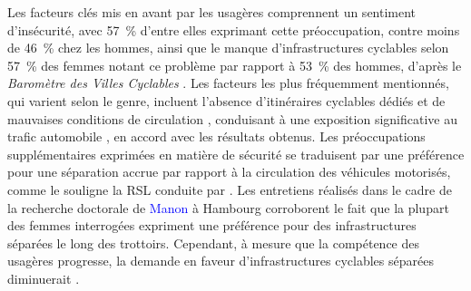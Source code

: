 \begin{refsegment}
Les facteurs clés mis en avant par les usagères comprennent un sentiment d'insécurité, avec 57~\% d'entre elles exprimant cette préoccupation, contre moins de 46~\% chez les hommes, ainsi que le manque d'infrastructures cyclables selon 57~\% des femmes notant ce problème par rapport à 53~\% des hommes, d'après le \textsl{Baromètre des Villes Cyclables} \textcolor{blue}{\autocite[26]{vermeulen_barometre_2022}}. Les facteurs les plus fréquemment mentionnés, qui varient selon le genre, incluent l'absence d'itinéraires cyclables dédiés et de mauvaises conditions de circulation \textcolor{blue}{\autocite[61]{dyck_perceived_2013}}, conduisant à une exposition significative au trafic automobile \textcolor{blue}{\autocites[36]{krizek_gender_2005}[9]{mitra_can_2019}}, en accord avec les résultats obtenus. Les préoccupations supplémentaires exprimées en matière de sécurité se traduisent par une préférence pour une séparation accrue par rapport à la circulation des véhicules motorisés, comme le souligne la \acrshort{RSL} conduite par \textcolor{blue}{\textcite[35, 49]{aldred_cycling_2017}}. Les entretiens réalisés dans le cadre de la recherche doctorale de \textcolor{blue}{Manon} \textcolor{blue}{\textcite[261]{eskenazi_voir_2022}} à Hambourg corroborent le fait que la plupart des femmes interrogées expriment une préférence pour des infrastructures séparées le long des trottoirs. Cependant, à mesure que la compétence des usagères progresse, la demande en faveur d'infrastructures cyclables séparées diminuerait \textcolor{blue}{\autocite[261]{eskenazi_voir_2022}}.%


\end{refsegment}
